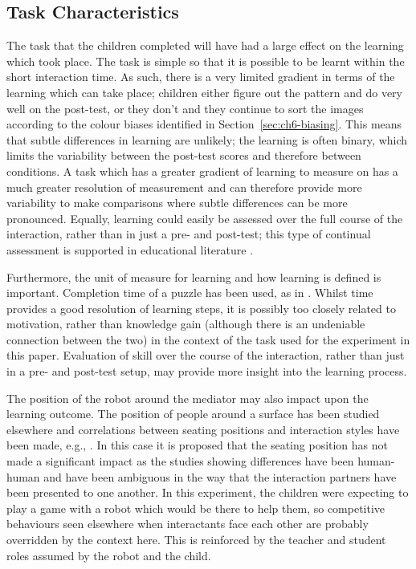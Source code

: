 \subsection{Task Characteristics}\label{sec:ch6-disc-task}
The task that the children completed will have had a large effect on the learning which took place. The task is simple so that it is possible to be learnt within the short interaction time. As such, there is a very limited gradient in terms of the learning which can take place; children either figure out the pattern and do very well on the post-test, or they don't and they continue to sort the images according to the colour biases identified in Section~\ref{sec:ch6-biasing}. This means that subtle differences in learning are unlikely; the learning is often binary, which limits the variability between the post-test scores and therefore between conditions. A task which has a greater gradient of learning to measure on has a much greater resolution of measurement and can therefore provide more variability to make comparisons where subtle differences can be more pronounced. Equally, learning could easily be assessed over the full course of the interaction, rather than in just a pre- and post-test; this type of continual assessment is supported in educational literature \citep{guskey2003classroom, myers2007assessing}.

Furthermore, the unit of measure for learning and how learning is defined is important. Completion time of a puzzle has been used, as in \cite{leyzberg2014personalizing}. Whilst time provides a good resolution of learning steps, it is possibly too closely related to motivation, rather than knowledge gain (although there is an undeniable connection between the two) in the context of the task used for the experiment in this paper. Evaluation of skill over the course of the interaction, rather than just in a pre- and post-test setup, may provide more insight into the learning process.

The position of the robot around the mediator may also impact upon the learning outcome. The position of people around a surface has been studied elsewhere and correlations between seating positions and interaction styles have been made, e.g., \cite{scott2004territoriality, tang2006collaborative}. In this case it is proposed that the seating position has not made a significant impact as the studies showing differences have been human-human and have been ambiguous in the way that the interaction partners have been presented to one another. In this experiment, the children were expecting to play a game with a robot which would be there to help them, so competitive behaviours seen elsewhere when interactants face each other are probably overridden by the context here. This is reinforced by the teacher and student roles assumed by the robot and the child.

